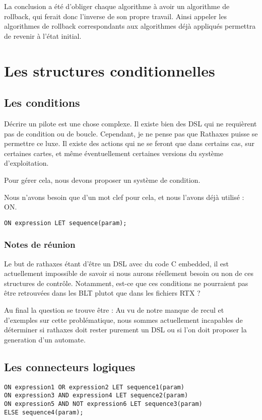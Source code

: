 \documentclass{rtxreport}
\begin{document}
La conclusion a été d'obliger chaque algorithme à avoir un algorithme de
rollback, qui ferait donc l'inverse de son propre travail. Ainsi appeler les
algorithmes de rollback correspondants aux algorithmes déjà appliqués permettra
de revenir à l'état initial.


\chapter{Les structures conditionnelles}

\section{Les conditions}
Décrire un pilote est une chose complexe. Il existe bien des DSL qui ne
requièrent pas de condition ou de boucle. Cependant, je ne pense pas que
Rathaxes puisse se permettre ce luxe. Il existe des actions qui ne se feront
que dans certains cas, sur certaines cartes, et même éventuellement certaines
versions du système d’exploitation.

Pour gérer cela, nous devons proposer un système de condition. 

Nous n’avons besoin que d’un mot clef pour cela, et nous l’avons déjà utilisé :
ON.
\begin{lstlisting}
ON expression LET sequence(param);
\end{lstlisting}

\subsection{Notes de réunion}
Le but de rathaxes étant d'être un DSL avec du code C embedded, il est
actuellement impossible de savoir si nous aurons réellement besoin ou non de ces
structures de contrôle. Notamment, est-ce que ces conditions ne pourraient pas
être retrouvées dans les BLT plutot que dans les fichiers RTX ?

Au final la question se trouve être : Au vu de notre manque de recul et
d'exemples sur cette problématique, nous sommes actuellement incapables de
déterminer si rathaxes doit rester purement un DSL ou si l'on doit proposer
la generation d'un automate.

\section{Les connecteurs logiques}
\begin{lstlisting}
ON expression1 OR expression2 LET sequence1(param)
ON expression3 AND expression4 LET sequence2(param)
ON expression5 AND NOT expression6 LET sequence3(param)
ELSE sequence4(param);
\end{lstlisting}
\end{document}
